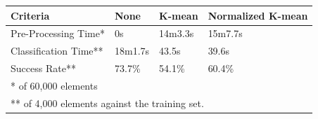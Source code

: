 \begin{table}[H]
\centering


\begin{tabular}{|l|p{2cm}|p{2cm}|p{2cm}|}\hline
Criteria              & None   & K-mean & Normalized K-mean \\ \hline
Pre-Processing Time*  & 0s     & 14m3.3s & 15m7.7s            \\ \hline
Classification Time** & 18m1.7s & 43.5s  & 39.6s             \\ \hline
Success Rate**        & 73.7\% & 54.1\% & 60.4\%            \\ \hline
\multicolumn{4}{|l|}{* of 60,000 elements} \\ 
\multicolumn{4}{|l|}{** of 4,000 elements against the training set.} \\ \hline
\end{tabular}



\end{table}
